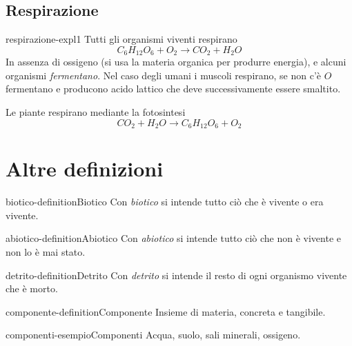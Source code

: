 \documentclass[preview]{standalone}
\begin{document}
\subsection{Respirazione}

\begin{snippet}{respirazione-expl1}
Tutti gli organismi viventi respirano
\[
    C_6H_{12}O_6 + O_2 \rightarrow CO_2 + H_2O
\]
In assenza di ossigeno (si usa la materia organica per produrre energia), e alcuni organismi \textit{fermentano}.
Nel caso degli umani i muscoli respirano, se non c'è \(O\) fermentano e producono acido lattico
che deve successivamente essere smaltito.

Le piante respirano mediante la fotosintesi
\[
    CO_2 + H_2O \rightarrow C_6H_{12}O_6 + O_2
\]
\end{snippet}

\section{Altre definizioni}

\begin{snippetdefinition}{biotico-definition}{Biotico}
    Con \textit{biotico} si intende tutto ciò che è vivente o era vivente.
\end{snippetdefinition}

\begin{snippetdefinition}{abiotico-definition}{Abiotico}
    Con \textit{abiotico} si intende tutto ciò che non è vivente e non lo è mai stato.
\end{snippetdefinition}

\begin{snippetdefinition}{detrito-definition}{Detrito}
    Con \textit{detrito} si intende il resto di ogni organismo vivente che è morto.
\end{snippetdefinition}


\begin{snippetdefinition}{componente-definition}{Componente}
    Insieme di materia, concreta e tangibile.
\end{snippetdefinition}

\begin{snippetexample}{componenti-esempio}{Componenti}
    Acqua, suolo, sali minerali, ossigeno.
\end{snippetexample}
\end{document}
